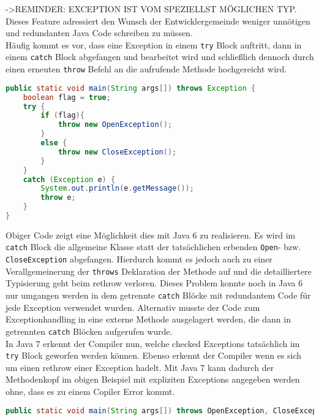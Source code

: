 \documentclass[times, 10pt,twocolumn]{article}
\begin{document}
->REMINDER: EXCEPTION IST VOM SPEZIELLST MÖGLICHEN TYP.
Dieses Feature adressiert den Wunsch der Entwicklergemeinde weniger unnötigen und redundanten Java Code schreiben zu müssen.\cite{sbJ7exeptions}\\

Häufig kommt es vor, dass eine Exception in einem \texttt{try} Block auftritt, dann in einem \texttt{catch} Block abgefangen und bearbeitet wird und schließlich dennoch durch einen erneuten \texttt{throw} Befehl an die aufrufende Methode hochgereicht wird.

\begin{lstlisting}[language=java,breaklines=true]
public static void main(String args[]) throws Exception {
    boolean flag = true;
    try {
        if (flag){
            throw new OpenException();
        }
        else {
            throw new CloseException();
        }
    }
    catch (Exception e) {
        System.out.println(e.getMessage());
        throw e;
    }
}
\end{lstlisting}

Obiger Code\cite{sbJ7exeptions} zeigt eine Möglichkeit dies mit Java 6 zu realisieren. Es wird im \texttt{catch} Block die allgemeine  Klasse statt der tatsächlichen erbenden \texttt{Open}- bzw. \texttt{CloseException} abgefangen. Hierdurch kommt es jedoch auch zu einer Verallgemeinerung der \texttt{throws} Deklaration der Methode auf  und die detailliertere Typisierung geht beim rethrow verloren. Dieses Problem konnte noch in Java 6 nur umgangen werden in dem getrennte \texttt{catch} Blöcke mit redundantem Code für jede Exception verwendet wurden. Alternativ musste der Code zum Exceptionhandling in eine externe Methode ausgelagert werden, die dann in getrennten \texttt{catch} Blöcken aufgerufen wurde.\cite{scjp6}\\

In Java 7 erkennt der Compiler nun, welche checked Exceptions tatsächlich im \texttt{try} Block geworfen werden können. Ebenso erkennt der Compiler wenn es sich um einen rethrow einer Exception hadelt. Mit Java 7 kann dadurch der Methodenkopf im obigen Beispiel mit expliziten Exceptions angegeben werden ohne, dass es zu einem Copiler Error kommt\cite{sbJ7exeptions}.

\begin{lstlisting}[language=java,breaklines=true]
public static void main(String args[]) throws OpenException, CloseException
\end{lstlisting}
\end{document}
